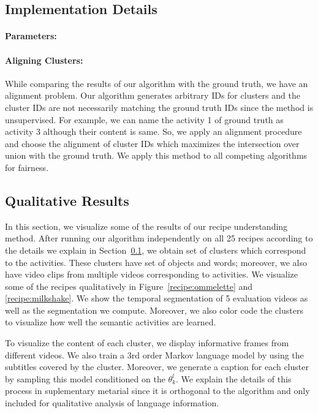 \subsection{Implementation Details}
\label{imp_det}
\paragraph{Parameters:}


\paragraph{Aligning Clusters:} While comparing the results of our algorithm with the ground truth, we have an alignment problem. Our algorithm generates arbitrary IDs for clusters and the cluster IDs are not necessarily matching the ground truth IDs since the method is unsupervised. For example, we can name the activity 1 of ground truth as activity 3 although their content is same. So, we apply an alignment procedure and choose the alignment of cluster IDs which maximizes the intersection over union with the ground truth. We apply this method to all competing algorithms for fairness.

\subsection{Qualitative Results}
In this section, we visualize some of  the results of our recipe understanding method. After running our algorithm independently on all 25 recipes according to the details we explain in Section~\ref{imp_det}, we obtain set of clusters which correspond to the activities. These clusters have set of objects and words; moreover, we also have video clips from multiple videos corresponding to activities. We visualize some of the recipes qualitatively in Figure~\ref{recipe:ommelette} and \ref{recipe:milkshake}. We show the temporal segmentation of 5 evaluation videos as well as the segmentation we compute. Moreover, we also color code the clusters to visualize how well the semantic activities are learned.

To visualize the content of each cluster, we display informative frames from different videos. We also train a 3rd order Markov language model\cite{languageModel} by using the subtitles covered by the cluster. Moreover, we generate a caption for each cluster by sampling this model conditioned on the $\theta^l_k$. We explain the details of this process in suplementary metarial since it is orthogonal to the algorithm and only included for qualitative analysis of language information.

